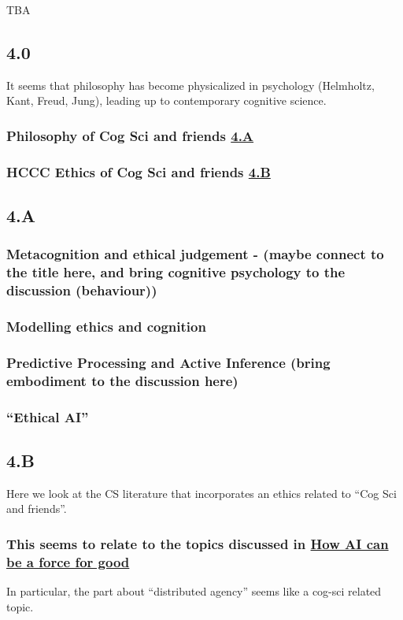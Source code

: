 \documentclass[11pt]{article}
\begin{document}
TBA
\subsection{4.0}
\label{sec:orgda41c79}

It seems that philosophy has become physicalized in psychology
(Helmholtz, Kant, Freud, Jung), leading up to contemporary cognitive
science.
\subsubsection{Philosophy of Cog Sci and friends \hyperref[sec:orgd80447c]{4.A}}
\label{sec:org23e5688}
\subsubsection{HCCC Ethics of Cog Sci and friends \hyperref[sec:org5d87364]{4.B}}
\label{sec:org1a4fb92}
\subsection{4.A}
\label{sec:orgd80447c}

\subsubsection{Metacognition and ethical judgement - (maybe connect to the title here, and bring cognitive psychology to the discussion (behaviour))}
\label{sec:org6f75814}
\subsubsection{Modelling ethics and cognition}
\label{sec:org8413f59}
\subsubsection{Predictive Processing and Active Inference (bring embodiment to the discussion here)}
\label{sec:org1243dcb}
\subsubsection{“Ethical AI”}
\label{sec:org48937bd}
\subsection{4.B}
\label{sec:org5d87364}

Here we look at the CS literature that incorporates an ethics related
to “Cog Sci and friends”.

\subsubsection{This seems to relate to the topics discussed in \hyperref[sec:orgbedef93]{How AI can be a force for good}}
\label{sec:org2c8202a}
In particular, the part about “distributed agency” seems like a
cog-sci related topic.
\end{document}
